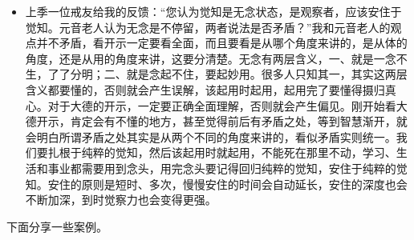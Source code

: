 \begin{itemize}
    \item 上季一位戒友给我的反馈：“您认为觉知是无念状态，是观察者，应该安住于觉知。元音老人认为无念是不停留，两者说法是否矛盾？”我和元音老人的观点并不矛盾，看开示一定要看全面，而且要看是从哪个角度来讲的，是从体的角度，还是从用的角度来讲，这要分清楚。无念有两层含义，一、就是一念不生，了了分明；二、就是念起不住，要起妙用。很多人只知其一，其实这两层含义都要懂的，否则就会产生误解，该起用时起用，起用完了要懂得摄归真心。对于大德的开示，一定要正确全面理解，否则就会产生偏见。刚开始看大德开示，肯定会有不懂的地方，甚至觉得前后有矛盾之处，等到智慧渐开，就会明白所谓矛盾之处其实是从两个不同的角度来讲的，看似矛盾实则统一。我们要扎根于纯粹的觉知，然后该起用时就起用，不能死在那里不动，学习、生活和事业都需要用到念头，用完念头要记得回归纯粹的觉知，安住于纯粹的觉知。安住的原则是短时、多次，慢慢安住的时间会自动延长，安住的深度也会不断加深，到时觉察力也会变得更强。
\end{itemize}

下面分享一些案例。

